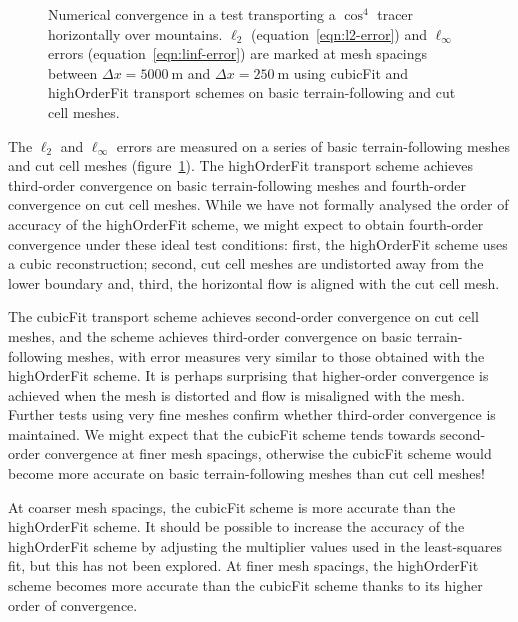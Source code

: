 \begin{figure}
	\centering
	
	\caption{Numerical convergence in a test transporting a $\cos^4$ tracer horizontally over mountains.
	$\ell_2$ (equation~\ref{eqn:l2-error}) and $\ell_\infty$ errors (equation~\ref{eqn:linf-error}) are marked at mesh spacings between $\Delta x = \SI{5000}{\meter}$ and $\Delta x = \SI{250}{\meter}$ using cubicFit and highOrderFit transport schemes on basic terrain-following and cut cell meshes.}
	\label{fig:highOrderFit:schaerAdvectSmooth:convergence}
\end{figure}

The $\ell_2$ and $\ell_\infty$ errors are measured on a series of basic terrain-following meshes and cut cell meshes (figure~\ref{fig:highOrderFit:schaerAdvectSmooth:convergence}).
The highOrderFit transport scheme achieves third-order convergence on basic terrain-following meshes and fourth-order convergence on cut cell meshes.
While we have not formally analysed the order of accuracy of the highOrderFit scheme, we might expect to obtain fourth-order convergence under these ideal test conditions: first, the highOrderFit scheme uses a cubic reconstruction; second, cut cell meshes are undistorted away from the lower boundary and, third, the horizontal flow is aligned with the cut cell mesh.

The cubicFit transport scheme achieves second-order convergence on cut cell meshes, and the scheme achieves third-order convergence on basic terrain-following meshes, with error measures very similar to those obtained with the highOrderFit scheme.
It is perhaps surprising that higher-order convergence is achieved when the mesh is distorted and flow is misaligned with the mesh.
Further tests using very fine meshes  confirm whether third-order convergence is maintained.
We might expect that the cubicFit scheme tends towards second-order convergence at finer mesh spacings, otherwise the cubicFit scheme would become more accurate on basic terrain-following meshes than cut cell meshes!

At coarser mesh spacings, the cubicFit scheme is more accurate than the highOrderFit scheme.
It should be possible to increase the accuracy of the highOrderFit scheme by adjusting the multiplier values used in the least-squares fit, but this has not been explored.
At finer mesh spacings, the highOrderFit scheme becomes more accurate than the cubicFit scheme thanks to its higher order of convergence.

